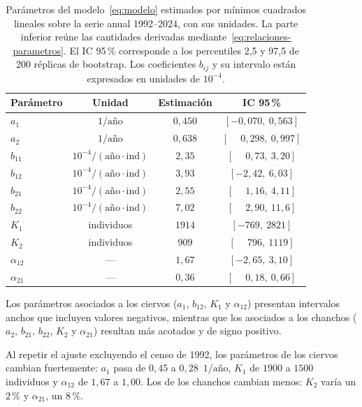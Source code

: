 \documentclass[11pt,a4paper]{article}
\begin{document}
\begin{table}[H]
\centering
\caption{Parámetros del modelo~\eqref{eq:modelo} estimados por mínimos
cuadrados lineales sobre la serie anual 1992--2024, con sus unidades. La
parte inferior reúne las cantidades derivadas
mediante~\eqref{eq:relaciones-parametros}. El IC 95\,\% corresponde a los
percentiles 2,5 y 97,5 de 200 réplicas de bootstrap. Los coeficientes
$b_{ij}$ y su intervalo están expresados en unidades de
$10^{-4}$.}
\label{tab:parametros}
\begin{tabular}{lccc}
\toprule
Parámetro & Unidad & Estimación & IC 95\,\% \\
\midrule
$a_1$ & $1/\text{año}$ & $0{,}450$ & $[-0{,}070,\ 0{,}563]$ \\
$a_2$ & $1/\text{año}$ & $0{,}638$ & $[\phantom{-}0{,}298,\ 0{,}997]$ \\
$b_{11}$ & $10^{-4}/(\text{año}\cdot\text{ind})$ & $2{,}35$ & $[\phantom{-}0{,}73,\ 3{,}20]$ \\
$b_{12}$ & $10^{-4}/(\text{año}\cdot\text{ind})$ & $3{,}93$ & $[-2{,}42,\ 6{,}03]$ \\
$b_{21}$ & $10^{-4}/(\text{año}\cdot\text{ind})$ & $2{,}55$ & $[\phantom{-}1{,}16,\ 4{,}11]$ \\
$b_{22}$ & $10^{-4}/(\text{año}\cdot\text{ind})$ & $7{,}02$ & $[\phantom{-}2{,}90,\ 11{,}6]$ \\
\midrule
$K_1$        & individuos & $1914$ & $[-769,\ 2821]$ \\
$K_2$        & individuos & $909$  & $[\phantom{-}796,\ 1119]$ \\
$\alpha_{12}$ & ---       & $1{,}67$ & $[-2{,}65,\ 3{,}10]$ \\
$\alpha_{21}$ & ---       & $0{,}36$ & $[\phantom{-}0{,}18,\ 0{,}66]$ \\
\bottomrule
\end{tabular}
\end{table}

Los parámetros asociados a los ciervos ($a_1$, $b_{12}$, $K_1$ y
$\alpha_{12}$) presentan intervalos anchos que incluyen valores
negativos, mientras que los asociados a los chanchos ($a_2$, $b_{21}$,
$b_{22}$, $K_2$ y $\alpha_{21}$) resultan más acotados y de signo
positivo.

Al repetir el ajuste excluyendo el censo de 1992, los parámetros de los
ciervos cambian fuertemente: $a_1$ pasa de $0{,}45$ a $0{,}28$~$1/\text{año}$,
$K_1$ de $1900$ a $1500$ individuos y $\alpha_{12}$ de $1{,}67$ a $1{,}00$.
Los de los chanchos cambian menos: $K_2$ varía un $2\,\%$ y $\alpha_{21}$,
un $8\,\%$.
\end{document}

